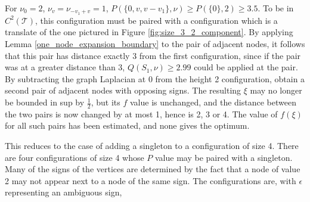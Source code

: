 \documentclass[a4paper, 12pt, notitlepage]{amsart}
\newcommand{\sT}{\mathscr{T}}
\theoremstyle{remark}
\begin{document}
For $\nu_0 = 2$, $\nu_{v} = \nu_{-v_1+v}=1$, $P(\{0, v, v-v_1\} , \nu) \geq P(\{0\}, 2) \geq 3.5$.   
To be in $C^2(\sT)$, this configuration must be paired with a configuration which is a translate of the one pictured in Figure \ref{fig:size_3_2_component}.  By applying Lemma \ref{one_node_expansion_boundary} to the pair of adjacent nodes, it follows that this pair has distance exactly 3 from the first configuration, since if the pair was at a greater distance than 3,  $Q(S_1, \nu) \geq 2.99$ could be applied at the pair.  By subtracting the graph Laplacian at 0 from the height 2 configuration, obtain a second pair of adjacent nodes with opposing signs.  The resulting $\xi$ may no longer be bounded in sup by $\frac{1}{2}$, but its $f$ value is unchanged, and the distance between the two pairs is now changed by at most 1, hence is 2, 3 or 4.  The value of $f(\xi)$ for all such pairs has been estimated, and none gives the optimum.



This reduces to the case of adding a singleton to a configuration of size 4.  There are four configurations of size 4 whose $P$ value may be paired with a singleton.  Many of the signs of the vertices are determined by the fact that a node of value 2 may not appear next to a node of the same sign.  The configurations are, with $\epsilon$ representing an ambiguous sign,
\end{document}
